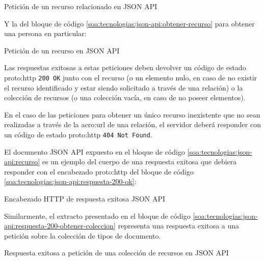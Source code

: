 \begin{listing}[H]
  \caption{Petición de un recurso relacionado en JSON API}
  \label{soa:tecnologias:json-api:obtener-recurso-relacionado}
\end{listing}

Y la del bloque de código \autoref{soa:tecnologias:json-api:obtener-recurso} para obtener una persona en particular:

\begin{listing}[H]
  \caption{Petición de un recurso en JSON API}
  \label{soa:tecnologias:json-api:obtener-recurso}
\end{listing}

Las respuestas exitosas a estas peticiones deben devolver un código de estado \gls{proto:http} \texttt{200 OK} junto con el recurso (o un elemento nulo, en caso de no existir el recurso identificado y estar siendo solicitado a través de una relación) o la colección de recursos (o una colección vacía, en caso de no poseer elementos).

En el caso de las peticiones para obtener un único recurso inexistente que no sean realizadas a través de la \gls{acro:url} de una relación, el servidor deberá responder con un código de estado \gls{proto:http} \texttt{404 Not Found}.

El documento JSON API expuesto en el bloque de código \autoref{soa:tecnologias:json-api:recurso} es un ejemplo del cuerpo de una respuesta exitosa que debiera responder con el encabezado \gls{proto:http} del bloque de código \autoref{soa:tecnologias:json-api:respuesta-200-ok}:

\begin{listing}[H]
  \caption{Encabezado HTTP de respuesta exitosa JSON API}
  \label{soa:tecnologias:json-api:respuesta-200-ok}
\end{listing}

Similarmente, el extracto presentado en el bloque de código \autoref{soa:tecnologias:json-api:respuesta-200-obtener-coleccion} representa una respuesta exitosa a una petición sobre la colección de tipos de documento.

\begin{listing}[H]
  \caption{Respuesta exitosa a petición de una colección de recursos en JSON API}
  \label{soa:tecnologias:json-api:respuesta-200-obtener-coleccion}
\end{listing}

